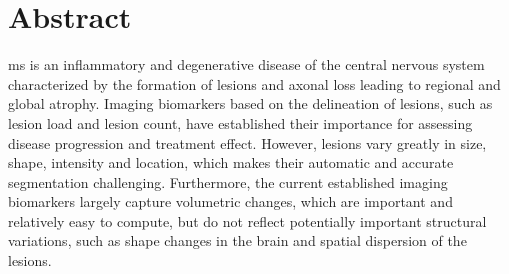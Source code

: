 \chapter*{Abstract}




\Gls{ms} is an inflammatory and degenerative disease of the central nervous
system characterized by the formation of lesions and axonal loss leading to
regional and global atrophy. Imaging biomarkers based on the delineation of
lesions, such as lesion load and lesion count, have established their importance
for assessing disease progression and treatment effect. However, lesions vary
greatly in size, shape, intensity and location, which makes their automatic and
accurate segmentation challenging. Furthermore, the current established imaging
biomarkers largely capture volumetric changes, which are important and
relatively easy to compute, but do not reflect potentially important structural
variations, such as shape changes in the brain and spatial dispersion of the
lesions.


